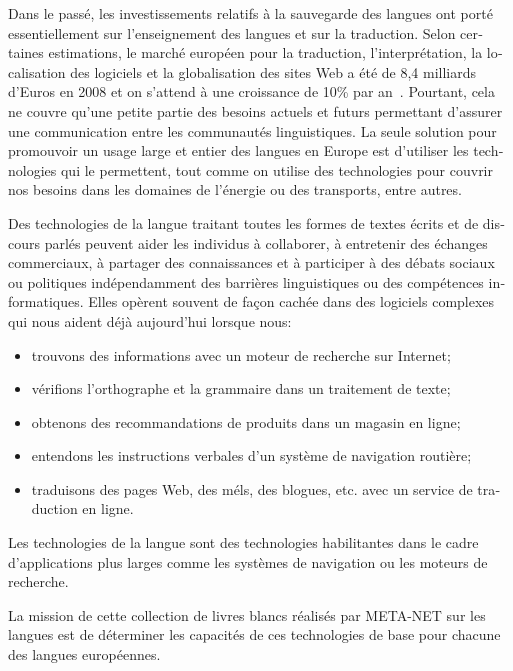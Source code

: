 \begin{french}
\begin{multicols}{2}
Dans le passé, les investissements relatifs à la sauvegarde des
langues ont porté essentiellement sur l'enseignement des
langues et sur la traduction. Selon certaines estimations, le marché
européen pour la traduction, l'interprétation, la localisation
des logiciels et la globalisation des sites Web a été de 8,4 milliards
d'Euros en 2008 et on s'attend à une croissance de
10\% par an~\cite{EC3}. Pourtant, cela ne couvre qu'une petite
partie des besoins actuels et futurs permettant d'assurer une
communication entre les communautés linguistiques. La seule solution
pour promouvoir un usage large et entier des langues en Europe est
d'utiliser les technologies qui le permettent, tout comme on
utilise des technologies pour couvrir nos besoins dans les domaines de
l'énergie ou des transports, entre autres.

Des technologies de la langue traitant toutes les formes de textes
écrits et de discours parlés peuvent aider les individus à collaborer,
à entretenir des échanges commerciaux, à partager des connaissances et
à participer à des débats sociaux ou politiques indépendamment des
barrières linguistiques ou des compétences informatiques. Elles
opèrent souvent de façon cachée dans des logiciels complexes qui nous
aident déjà aujourd'hui lorsque nous:
\begin{itemize}
\item trouvons des informations avec un moteur de recherche sur
  Internet;
\item vérifions l'orthographe et la grammaire dans un
  traitement de texte;
\item obtenons des recommandations de produits dans un magasin en
  ligne;
\item entendons les instructions verbales d'un système de
  navigation routière;
\item traduisons des pages Web, des méls, des blogues, etc. avec un service de traduction en ligne.
\end{itemize}
Les technologies de la langue sont des technologies habilitantes dans
le cadre d'applications plus larges comme les systèmes de
navigation ou les moteurs de recherche. 



La mission de cette collection
de livres blancs réalisés par META-NET sur les langues est de
déterminer les capacités de ces technologies de base pour chacune des
langues européennes.



\end{multicols}
\end{french}
